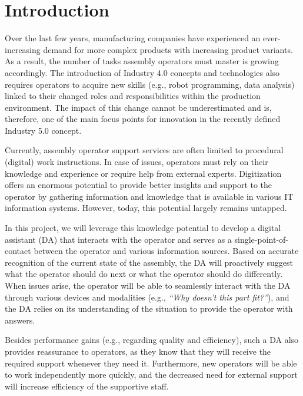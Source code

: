 \section{Introduction}\label{sec:Introduction}

Over the last few years, manufacturing companies have experienced an ever-increasing demand for more complex products with increasing product variants. As a result, the number of tasks assembly operators must master is growing accordingly. The introduction of Industry 4.0 concepts and technologies also requires operators to acquire new skills (e.g., robot programming, data analysis) linked to their changed roles and responsibilities within the production environment. The impact of this change cannot be underestimated and is, therefore, one of the main focus points for innovation in the recently defined Industry 5.0 concept. 

Currently, assembly operator support services are often limited to procedural (digital) work instructions. In case of issues, operators must rely on their knowledge and experience or require help from external experts. Digitization offers an enormous potential to provide better insights and support to the operator by gathering information and knowledge that is available in various IT information systems. However, today, this potential largely remains untapped. 

In this project, we will leverage this knowledge potential to develop a digital assistant (DA) that interacts with the operator and serves as a single-point-of-contact between the operator and various information sources. Based on accurate recognition of the current state of the assembly, the DA will proactively suggest what the operator should do next or what the operator should do differently. When issues arise, the operator will be able to seamlessly interact with the DA through various devices and modalities (e.g., \textit{``Why doesn't this part fit?''}), and the DA relies on its understanding of the situation to provide the operator with answers. 

Besides performance gains (e.g., regarding quality and efficiency), such a DA also provides reassurance to operators, as they know that they will receive the required support whenever they need it. Furthermore, new operators will be able to work independently more quickly, and the decreased need for external support will increase efficiency of the supportive staff.
